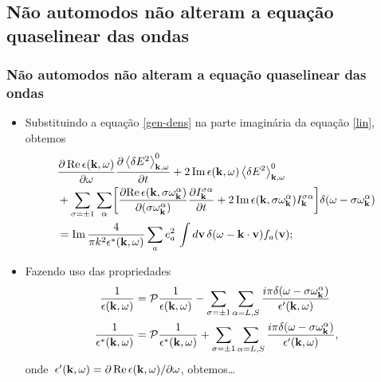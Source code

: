 \documentclass[10pt,aspectratio=1610,lualatex]{beamer}
\begin{document}
\subsection{Não automodos não alteram a equação quaselinear das  ondas}
\begin{frame}
  \frametitle{Não automodos não alteram a equação
    quaselinear das  ondas}
  \begin{itemize}
    \item Substituindo a equação \eqref{gen-dens} na parte
    imaginária da equação \eqref{lin}, obtemos
    \begin{equation*}
      \begin{split}
	&\frac{\partial\, \mbox{Re}\,
	  \epsilon({\bf k},\omega)}{\partial \omega}
	\frac{\partial \left< \delta E^2
	  \right>_{{\bf k},\omega}^0}{\partial t}
	+2\,\mbox{Im}\,\epsilon({\bf k},\omega)
	\left< \delta E^2\right>_{{\bf k},\omega}^0\\
	&+\sum_{\sigma=\pm 1}\sum_\alpha\biggl[
	\frac{\partial \mbox{Re}\,
	  \epsilon({\bf k},\sigma\omega_{\bf k}^\alpha)}
	{\partial(\sigma\omega_{\bf k}^\alpha)}
	\frac{\partial I_{\bf k}^{\sigma \alpha}}{\partial t}
	+2\,\mbox{Im}\,\epsilon({\bf k},\sigma\omega_{\bf k}^\alpha)
	I_{\bf k}^{\sigma \alpha}\biggr]
	\delta(\omega-\sigma\omega_{\bf k}^\alpha)\\
	&=\mbox{Im}\,\frac{4}{\pi k^2\epsilon^{*}({\bf k},\omega)}
	\sum_a e^2_a\, \int d{\bf v}\,
	\delta(\omega-{\bf k \cdot v})f_a({\bf v});
      \end{split}
    \end{equation*}
    \vspace{-0.4cm}
    \pause
    \item Fazendo uso das propriedades
    \begin{equation*}
      \begin{split}
	\frac{1}{\epsilon({\bf k},\omega)}
	&=\mathcal{P}\frac{1}{\epsilon({\bf k},\omega)}
	-\sum_{\sigma=\pm 1}\sum_{\alpha=L,S}
	\frac{i\pi \delta(\omega-\sigma\omega_{\bf k}^\alpha)}
	{\epsilon '({\bf k},\omega)}\\
	\frac{1}{\epsilon^*({\bf k},\omega)}
	&=\mathcal{P}\frac{1}{\epsilon^*({\bf k},\omega)}
	+\sum_{\sigma=\pm 1}\sum_{\alpha=L,S}
	\frac{i\pi \delta(\omega-\sigma\omega_{\bf k}^\alpha)}
	{\epsilon '({\bf k},\omega)},
      \end{split}
    \end{equation*}
    onde\,
    $ \epsilon '({\bf k},\omega)=\partial\, \mbox{Re}\,
    \epsilon({\bf k},\omega)/\partial \omega$, obtemos\dots
  \end{itemize}
\end{frame}
\end{document}
